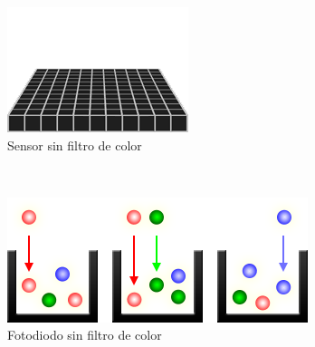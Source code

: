 \documentclass[conference]{IEEEtran}
\begin{document}
\begin{figure}[H]
    \centering
    \begin{subfigure}[b]{3cm}
        \includegraphics[width=\textwidth]{bayer1}
        \caption{Sensor sin filtro de color}
        \label{no_filter_cavity}
    \end{subfigure}
    ~ %
    \begin{subfigure}[b]{3cm}
        \includegraphics[width=\textwidth]{bayer2}
        \caption{Fotodiodo sin filtro de color}
        \label{fotodiodo_sin_filtro}
    \end{subfigure}
    ~ %
    \begin{subfigure}[b]{3cm}

\end{subfigure}
\end{figure}
\end{document}
